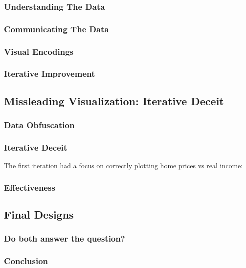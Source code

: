 \documentclass{article}
\begin{document}
\subsubsection{Understanding The Data}
\subsubsection{Communicating The Data}
\subsubsection{Visual Encodings}
\subsubsection{Iterative Improvement}

\subsection{Missleading Visualization: Iterative Deceit}
\subsubsection{Data Obfuscation}
\subsubsection{Iterative Deceit}
The first iteration had a focus on correctly plotting home prices vs real income:
\subsubsection{Effectiveness}

\subsection{Final Designs}
\subsubsection{Do both answer the question?}
\subsubsection{Conclusion}

\newpage
\begin{refcontext}[sorting=nyt]
\printbibliography
\end{refcontext}
\end{document}
